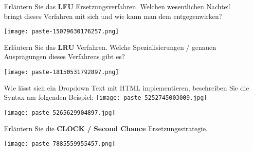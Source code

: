 \documentclass{article}
\begin{document}
\begin{tcolorbox}[colback=white!10!white,colframe=lightgray!75!black,
  savelowerto=\jobname_ex.tex,breakable,enhanced,lines before break=40]

\begin{center}
 Erläutern Sie das
\textbf{LFU
}Ersetzungsverfahren. Welchen wesentlichen Nachteil bringt dieses Verfahren mit sich und wie kann man dem entgegenwirken? 

\end{center}

\tcblower

\justifying
\texttt{[image: paste-15079630176257.png]}

\end{tcolorbox}
\begin{tcolorbox}[colback=white!10!white,colframe=lightgray!75!black,
  savelowerto=\jobname_ex.tex,breakable,enhanced,lines before break=40]

\begin{center}
 Erläutern Sie das 
\textbf{LRU
}Verfahren. Welche Spezialisierungen / genauen Ausprägungen dieses Verfahrens gibt es? 

\end{center}

\tcblower

\justifying
\texttt{[image: paste-18150531792897.png]}

\end{tcolorbox}
\begin{tcolorbox}[colback=white!10!white,colframe=lightgray!75!black,
  savelowerto=\jobname_ex.tex,breakable,enhanced,lines before break=40]

\begin{center}
 Wie lässt sich ein Dropdown Text mit HTML implementieren, beschreiben Sie die Syntax am folgenden Beispiel:
\texttt{[image: paste-5252745003009.jpg]}
 

\end{center}

\tcblower

\justifying
\texttt{[image: paste-5265629904897.jpg]}

\end{tcolorbox}
\begin{tcolorbox}[colback=white!10!white,colframe=lightgray!75!black,
  savelowerto=\jobname_ex.tex,breakable,enhanced,lines before break=40]

\begin{center}
 Erläutern Sie die 
\textbf{CLOCK / Second Chance
}Ersetzungsstrategie. 

\end{center}

\tcblower

\justifying
\texttt{[image: paste-7885559955457.png]}

\end{tcolorbox}
\end{document}
